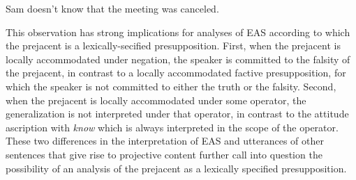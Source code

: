 \documentclass[11pt,fleqn]{article}
\newcommand{\6}{\mbox{$[\hspace*{-.6mm}[$}}
\newcommand{\9}{\mbox{$]\hspace*{-.6mm}]$}}
\begin{document}
\begin{exe}
\ex\label{stop} Sam doesn't know that the meeting was canceled.
\end{exe}
This observation has strong implications for analyses of EAS according to which the prejacent is a lexically-secified presupposition. First, when the prejacent is locally accommodated under negation, the speaker is committed to the falsity of the prejacent, in contrast to a locally accommodated factive presupposition, for which the speaker is not committed to either the truth or the falsity. Second, when the prejacent is locally accommodated under some operator, the generalization is not interpreted under that operator, in contrast to the attitude ascription with {\em know} which is always interpreted in the scope of the operator. These two differences in the interpretation of EAS and utterances of other sentences that give rise to projective content further call into question the possibility of an analysis of the prejacent as a lexically specified presupposition. 

%
%
%
%
%
%
\end{document}
